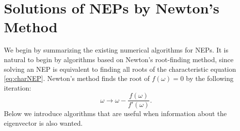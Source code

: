 \documentclass[final,leqno,onefignum,onetabnum]{siamltex1213}
\begin{document}
\section{Solutions of NEPs by Newton's Method }
We begin by summarizing the existing numerical algorithms for NEPs. It is natural to begin by algorithms based on Newton's root-finding method, since solving an NEP is equivalent to finding all roots of the characteristic equation \ref{eq:charNEP}. Newton's method finds the root of $f(\omega)=0$ by the following iteration:
\begin{equation}
	\label{eq:NewtIterate}
	\omega \rightarrow \omega - \frac{f(\omega)}{f'(\omega)}.
\end{equation}
Below we introduce algorithms that are useful when information about the eigenvector is also wanted.
\end{document}
